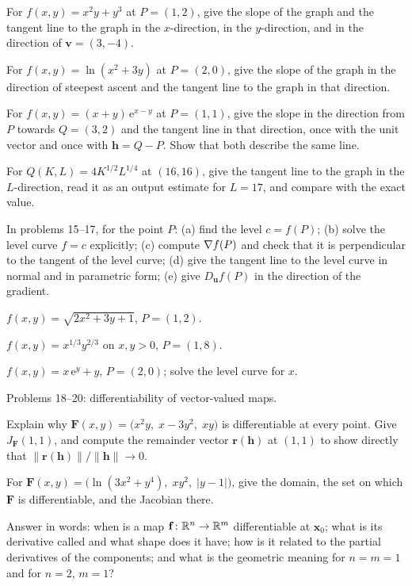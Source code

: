 \begin{problems}[resume]
  \item For $f(x,y)=x^{2}y+y^{3}$ at $P=(1,2)$, give the slope of the graph
        and the tangent line to the graph in the $x$-direction, in the
        $y$-direction, and in the direction of $\mathbf{v}=(3,-4)$.
  \item For $f(x,y)=\ln(x^{2}+3y)$ at $P=(2,0)$, give the slope of the
        graph in the direction of steepest ascent and the tangent line to
        the graph in that direction.
  \item For $f(x,y)=(x+y)\,\mathrm{e}^{x-y}$ at $P=(1,1)$, give the slope in
        the direction from $P$ towards $Q=(3,2)$ and the tangent line in
        that direction, once with the unit vector and once with
        $\mathbf{h}=Q-P$. Show that both describe the same line.
  \item For $Q(K,L)=4K^{1/2}L^{1/4}$ at $(16,16)$, give the tangent line to
        the graph in the $L$-direction, read it as an output estimate for
        $L=17$, and compare with the exact value.
\end{problems}

In problems 15--17, for the point $P$: (a) find the level $c=f(P)$; (b)
solve the level curve $f=c$ explicitly; (c) compute $\nabla f(P)$ and check
that it is perpendicular to the tangent of the level curve; (d) give the
tangent line to the level curve in normal and in parametric form; (e) give
$D_{\mathbf{u}}f(P)$ in the direction of the gradient.

\begin{problems}[resume]
  \item $f(x,y)=\sqrt{2x^{2}+3y+1}$, \;$P=(1,2)$.
  \item $f(x,y)=x^{1/3}y^{2/3}$ on $x,y>0$, \;$P=(1,8)$.
  \item $f(x,y)=x\,\mathrm{e}^{y}+y$, \;$P=(2,0)$; solve the level curve
        for $x$.
\end{problems}

Problems 18--20: differentiability of vector-valued maps.

\begin{problems}[resume]
  \item Explain why
        $\mathbf{F}(x,y)=\bigl(x^{2}y,\;x-3y^{2},\;xy\bigr)$ is
        differentiable at every point. Give $J_{\mathbf{F}}(1,1)$, and
        compute the remainder vector $\mathbf{r}(\mathbf{h})$ at $(1,1)$
        to show directly that $\|\mathbf{r}(\mathbf{h})\|/\|\mathbf{h}\|\to0$.
  \item For $\mathbf{F}(x,y)=\bigl(\ln(3x^{2}+y^{4}),\;xy^{2},\;|y-1|\bigr)$,
        give the domain, the set on which $\mathbf{F}$ is differentiable,
        and the Jacobian there.
  \item Answer in words: when is a map $\mathbf{f}\colon\mathbb{R}^{n}\to\mathbb{R}^{m}$
        differentiable at $\mathbf{x}_{0}$; what is its derivative called
        and what shape does it have; how is it related to the partial
        derivatives of the components; and what is the geometric meaning
        for $n=m=1$ and for $n=2$, $m=1$?
\end{problems}

